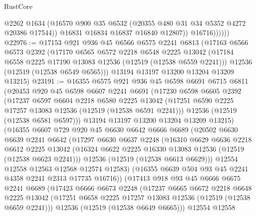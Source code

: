 \begin{lexlean}{RustCore}
\begin{coremodule}
                    @2262
                    @1634
                    (@16570 @900 @35 @6532 (@20355 @480 @31 @34 @5352 @4272 @20386 @17544))
                    @16831
                    @16834
                    @16837
                    @16840
                    @12807))
                @16716))))))
@22976 := @17153
    @921
    @936
    @45
    @6566
    @6575
    @2241
    @6813
    (@17163
      @6566
      @6573
      @2392
      (@17170
        @6565
        @6572
        @2218
        @6548
        @2225
        @13042
        (@17184 @6558 @2225 @17190 @13083 @12536 (@12519 (@12538 @6559 @2241)))
        @12536
        (@12519 (@12538 @6549 @6565)))
      @13194
      @13197
      @13200
      @13204
      @13209
      @13215)
@23191 := @16355
    @6575
    @921
    @936
    @45
    @6598
    @6691
    @6715
    @6811
    (@20453
      @920
      @45
      @6598
      @6607
      @2241
      @6691
      (@17230
        @6598
        @6605
        @2392
        (@17237
          @6597
          @6604
          @2218
          @6580
          @2225
          @13042
          (@17251 @6590 @2225 @17257 @13083 @12536 (@12519 (@12538 @6591 @2241)))
          @12536
          (@12519 (@12538 @6581 @6597)))
        @13194
        @13197
        @13200
        @13204
        @13209
        @13215)
      (@16355
        @6607
        @729
        @920
        @45
        @6630
        @6642
        @6666
        @6689
        (@20502
          @6630
          @6639
          @2241
          @6642
          (@17297
            @6630
            @6637
            @2248
            (@16310
              @6629
              @6636
              @2218
              @6612
              @2225
              @13042
              (@16324 @6622 @2225 @16330 @13083 @12536 (@12519 (@12538 @6623 @2241)))
              @12536
              (@12519 (@12538 @6613 @6629)))
            @12554
            @12558
            @12563
            @12568
            @12574
            @12583)
          (@16355 @6639 @504 @93 @45 @2241 @4358 @2241 @2313 @17735 @16716))
        (@17413
          @918
          @93
          @45
          @6666
          @6675
          @2241
          @6689
          (@17423
            @6666
            @6673
            @2248
            (@17237
              @6665
              @6672
              @2218
              @6648
              @2225
              @13042
              (@17251 @6658 @2225 @17257 @13083 @12536 (@12519 (@12538 @6659 @2241)))
              @12536
              (@12519 (@12538 @6649 @6665)))
            @12554
            @12558

\end{coremodule}
\end{lexlean}
